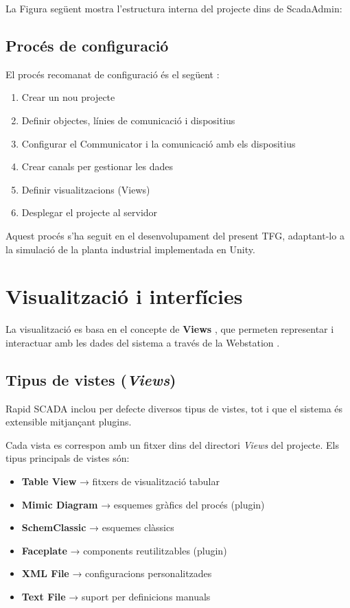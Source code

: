 \documentclass[12pt,a4paper]{report}
\begin{document}
La Figura següent mostra l'estructura interna del projecte dins de ScadaAdmin:

\subsection{Procés de configuració}

 El procés recomanat de configuració és el següent \cite{rapidscada_config_basics}:

\begin{enumerate}
    \item Crear un nou projecte
    \item Definir objectes, línies de comunicació i dispositius
    \item Configurar el Communicator i la comunicació amb els dispositius
    \item Crear canals per gestionar les dades
    \item Definir visualitzacions (Views)
    \item Desplegar el projecte al servidor
\end{enumerate}

Aquest procés s'ha seguit en el desenvolupament del present TFG, adaptant-lo a la simulació de la planta industrial implementada en Unity.

\section{Visualització i interfícies}
La visualització es basa en el concepte de \textbf{Views} \cite{rapidscada_views}, que permeten representar i interactuar amb les dades del sistema a través de la Webstation \cite{rapidscada_views}.


\subsection{Tipus de vistes (\textit{Views})}

Rapid SCADA inclou per defecte diversos tipus de vistes, tot i que el sistema és extensible mitjançant plugins.


Cada vista es correspon amb un fitxer dins del directori \textit{Views} del projecte. Els tipus principals de vistes són:


\begin{itemize}
    \item \textbf{Table View} → fitxers de visualització tabular
    \item \textbf{Mimic Diagram} → esquemes gràfics del procés (plugin)
    \item \textbf{SchemClassic} → esquemes clàssics 
    \item \textbf{Faceplate} → components reutilitzables (plugin)
    \item \textbf{XML File} → configuracions personalitzades
    \item \textbf{Text File} → suport per definicions manuals
\end{itemize}
\end{document}

